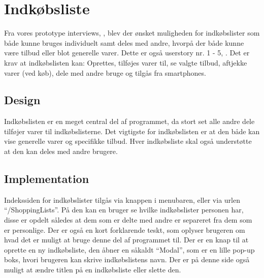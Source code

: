 \section{Indkøbsliste} 
Fra vores prototype interviews, , blev der ønsket muligheden for indkøbslister som både kunne bruges individuelt samt deles med andre, hvorpå der både kunne være tilbud eller blot generelle varer. 
Dette er også userstory nr. 1 - 5, . 
Det er krav at indkøbslisten kan: Oprettes, tilføjes varer til, se valgte tilbud, aftjekke varer (ved køb), dele med andre bruge og tilgås fra smartphones.
\subsection{Design}
Indkøbslisten er en meget central del af programmet, da stort set alle andre dele tilføjer varer til indkøbslisterne.
Det vigtigste for indkøbslisten er at den både kan vise generelle varer og specifikke tilbud. 
Hver indkøbsliste skal også understøtte at den kan deles med andre brugere. 
\subsection{Implementation}
Indekssiden for indkøbslister tilgås via knappen i menubaren, eller via urlen ``/ShoppingLists''.
På den kan en bruger se hvilke indkøbslister personen har, disse er opdelt således at dem som er delte med andre er separeret fra dem som er personlige.
Der er også en kort forklarende teskt, som oplyser brugeren om hvad det er muligt at bruge denne del af programmet til.
Der er en knap til at oprette en ny indkøbsliste, den åbner en såkaldt ``Modal'', som er en lille pop-up boks, hvori brugeren kan skrive indkøbslistens navn. 
Der er på denne side også muligt at ændre titlen på en indkøbsliste eller slette den.

